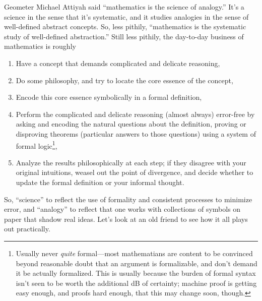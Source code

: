 Geometer Michael Attiyah said ``mathematics is the science of analogy.''
It's a science in the sense that it's systematic, and it studies analogies in the sense of well-defined abstract concepts.
So, less pithily, ``mathematics is the systematic study of well-defined abstraction.''
Still less pithily, the day-to-day business of mathematics is roughly
\begin{enumerate}
\item Have a concept that demands complicated and delicate reasoning,
\item Do some philosophy, and try to locate the core essence of the concept,
\item Encode this core essence symbolically in a formal definition,
\item Perform the complicated and delicate reasoning (almost always) error-free by asking and encoding the natural questions about the definition,
  proving or disproving theorems (particular answers to those questions) using a system of formal logic\footnote
  {
    Usually never \textit{quite} formal---most mathematians are content to be convinced beyond reasonable doubt that an argument is formalizable,
    and don't demand it be actually formalized.
    This is usually because the burden of formal syntax isn't seen to be worth the additional \si{dB} of certainty;
    machine proof is getting easy enough, and proofs hard enough, that this may change soon, though.
  },
\item Analyze the results philosophically at each step; if they disagree with your original intuitions, weasel out the point of divergence,
  and decide whether to update the formal definition or your informal thought.
\end{enumerate}
So, ``science'' to reflect the use of formality and consistent processes to minimize error, and ``analogy'' to reflect that one works with
collections of symbols on paper that shadow real ideas.
Let's look at an old friend to see how it all plays out practically.

